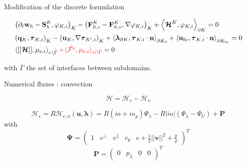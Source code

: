\documentclass[24pt,t,table, aspectratio=169]{beamer}
\newcommand{\vecu}{\mathbf{u}}
\newcommand{\vecF}{\mathbf{F}}
\newcommand{\vecS}{\mathbf{S}}
\newcommand{\vecq}{\mathbf{q}}
\newcommand{\vecw}{\mathbf{w}}
\newcommand{\vecP}{\mathbf{P}}
\newcommand{\vectau}{\boldsymbol{\tau}}
\newcommand{\vecPsi}{\boldsymbol{\Psi}}
\newcommand{\vecHcal}{\boldsymbol{\mathcal{H}}}
\newcommand{\veclambda}{\boldsymbol{\lambda}}
\newcommand{\vecn}{\mathbf{n}}
\newcommand{\Gammabar}{\bar{\Gamma}}
\begin{document}
\begin{frame}{Modification of the discrete formulation}

\begin{framed}
\begin{equation*}
	\begin{aligned}
		& \left(\partial_t \vecw_h - \vecS_h^K, \varphi_{K,i} \right)_{K} - \left(\vecF_{h,c}^K - \vecF_{h,v}^K, \nabla \varphi_{K,i} \right)_{K} + \left\langle \vecHcal^K, \varphi_{K,i} \right\rangle_{\partial K} = 0\\
		& \left(\vecq_K, \vectau_{K,i}\right)_{K} - \left(\vecu_K, \nabla \vectau_{K',i}\right)_{K} + \left\langle \veclambda_{\partial K}, \vectau_{K,i} \cdot \vecn \right\rangle_{\partial K_0} + \left\langle \vecu_{bc}, \vectau_{K,i} \cdot \vecn \right\rangle_{\partial K_{bc}} = 0\\
		& \left\langle[[\vecHcal]], \mu_{e,i} \right\rangle_{e\setminus\Gammabar} \textcolor{red}{+ \langle \Tilde{\mathcal{F}^e}, \mu_{e,i}\rangle_{e\cap\Gammabar}} = 0\\
	\end{aligned}
\end{equation*}
\end{framed}

with $\bar{\Gamma}$ the set of interfaces between subdomains.

\end{frame}

\begin{frame}{Numerical fluxes : convection}

\begin{framed}
\begin{equation*}
\vecHcal = \vecHcal_c - \vecHcal_v
\end{equation*}
\end{framed}

\begin{equation*}
	\vecHcal_c = R \vecHcal_{c,n}(\vecu, \veclambda) = R (\dot{m} + \dot{m}_p) \Psi_\lambda - R |\dot{m}| (\Psi_\lambda - \Psi_U) + \vecP
\end{equation*}
with
\begin{equation*}
	\vecPsi = \begin{pmatrix} 1 & v^\perp & v^\parallel & v_\theta & e + \frac{1}{2} ||\mathbf{v}||^2 + \frac{p}{\rho} \end{pmatrix}^T
\end{equation*}
\begin{equation*}
\vecP = \begin{pmatrix} 0 & p_\lambda & 0 & 0 \end{pmatrix}^T
\end{equation*}


\end{frame}
\end{document}
